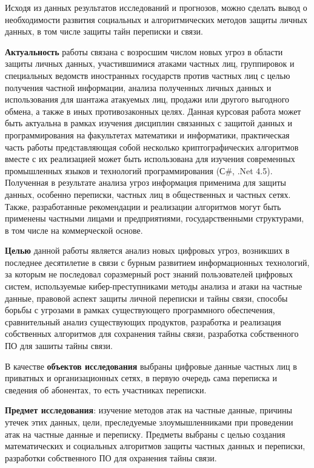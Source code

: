 Исходя из данных результатов исследований и прогнозов, можно сделать вывод о необходимости развития социальных  и алгоритмических  методов защиты личных данных, в том числе защиты тайн переписки и  связи.   

\textbf{Актуальность} работы  связана с возросшим числом новых угроз в области защиты личных данных, участившимися атаками частных лиц, группировок и специальных ведомств иностранных государств против частных лиц с целью получения частной информации, анализа полученных личных данных   и использования для шантажа атакуемых лиц, продажи или другого выгодного обмена, а также  в иных противозаконных целях. Данная курсовая работа может быть актуальна в рамках изучения дисциплин связанных с защитой данных и программирования на факультетах математики и информатики, практическая часть работы представляющая собой несколько криптографических алгоритмов вместе с их реализацией может быть использована для изучения современных промышленных языков и технологий программирования (С\#, .Net 4.5). Полученная в результате анализа угроз информация применима для защиты   данных, особенно переписки, частных лиц в общественных и частных сетях. Также, разработанные рекомендации и реализации алгоритмов могут быть применены частными лицами и предприятиями, государственными структурами, в том числе на коммерческой основе. 

\textbf{Целью} данной работы является %
 анализ новых цифровых угроз, возникших в последнее десятилетие в связи с бурным развитием информационных технологий, за которым не последовал соразмерный рост знаний пользователей цифровых систем, используемые кибер-преступниками методы анализа и атаки на частные данные, правовой аспект защиты личной переписки и тайны связи, способы борьбы с угрозами  в рамках существующего программного обеспечения, %
 сравнительный анализ существующих продуктов, разработка и реализация собственных алгоритмов для сохранения тайны связи, разработка собственного ПО для зашиты тайны связи.	
 
 В качестве \textbf{объектов исследования} выбраны цифровые данные частных лиц в приватных и организационных сетях, в первую очередь сама  переписка и сведения об абонентах, то есть участниках переписки.
 
 \textbf{Предмет исследования}: изучение методов атак на частные данные, причины утечек этих данных, цели, преследуемые злоумышленниками при проведении атак на частные данные и переписку. Предметы выбраны  с целью создания математических и социальных алгоритмов защиты частных данных и переписки, разработки собственного ПО для охранения тайны связи.
 \newpage %
